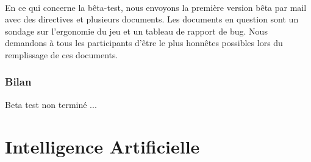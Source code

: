 \documentclass[11pt]{article} %
\begin{document}
\paragraph{}
En ce qui concerne la bêta-test, nous envoyons la première version bêta par mail avec des directives et plusieurs documents. Les documents en question sont un sondage sur l'ergonomie du jeu et un tableau de rapport de bug. Nous demandons à tous les participants d'être le plus honnêtes possibles lors du remplissage de ces documents.

\subsubsection{Bilan}


Beta test non terminé ...

\section{Intelligence Artificielle}
\end{document}

